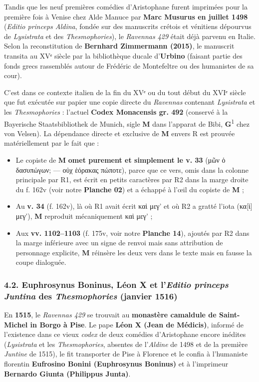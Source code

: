 \documentclass[11pt, a4paper, twoside]{article}
\renewcommand{\_}{\origunderscore\penalty0\relax}
\renewcommand{\texttt}[1]{#1}
\newcommand{\R}{\textbf{R}}
\newcommand{\Run}{\textbf{R}\textsuperscript{1}}
\newcommand{\Rdeux}{\textbf{R}\textsuperscript{2}}
\newcommand{\Gun}{\textbf{G}\textsuperscript{1}}
\newcommand{\M}{\textbf{M}}
\newcommand{\Bibi}{\textit{Bibi}}
\def\R{R}%
\def\Run{R1}%
\def\Rdeux{R2}%
\def\Bibi{Bibi}%
\begin{document}
Tandis que les neuf premières comédies d'Aristophane furent imprimées pour la première fois à Venise chez Alde Manuce par \textbf{Marc Musurus en juillet 1498} (\textit{Editio princeps Aldina}, fondée sur des manuscrits crétois et vénitiens dépourvus de \textit{Lysistrata} et des \textit{Thesmophories}), le \textit{Ravennas 429} était déjà parvenu en Italie. Selon la reconstitution de \textbf{Bernhard Zimmermann (2015)}, le manuscrit transita au XVᵉ siècle par la bibliothèque ducale d'\textbf{Urbino} (faisant partie des fonds grecs rassemblés autour de Frédéric de Montefeltre ou des humanistes de sa cour).

C'est dans ce contexte italien de la fin du XVᵉ ou du tout début du XVIᵉ siècle que fut exécutée sur papier une copie directe du \textit{Ravennas} contenant \textit{Lysistrata} et les \textit{Thesmophories} : l'actuel \textbf{Codex Monacensis gr. 492} (conservé à la Bayerische Staatsbibliothek de Munich, sigle \M{} dans l'apparat de \Bibi{}, \Gun{} chez von Velsen). La dépendance directe et exclusive de \M{} envers \R{} est prouvée matériellement par le fait que :
\begin{itemize}[leftmargin=1.5em, itemsep=2pt]
  \item Le copiste de \M{} \textbf{omet purement et simplement le v. 33} (\texttt{μῶν ὁ δασυπώγων; — οὐχ ἑόρακας πώποτε}), parce que ce vers, omis dans la colonne principale par \Run{}, est écrit en petits caractères par \Rdeux{} dans la marge droite du \texttt{f. 162v} (voir notre \textbf{Planche 02}) et a échappé à l'œil du copiste de \M{} ;
  \item Au \textbf{v. 34} (\texttt{f. 162v}), là où \Run{} avait écrit \texttt{καὶ μεγ'} et où \Rdeux{} a gratté l'iota (\texttt{κα[ὶ] μεγ'}), \M{} reproduit mécaniquement \texttt{καὶ μεγ'} ;
  \item Aux \textbf{vv. 1102–1103} (\texttt{f. 175v}, voir notre \textbf{Planche 14}), ajoutés par \Rdeux{} dans la marge inférieure avec un signe de renvoi mais sans attribution de personnage explicite, \M{} réinsère les deux vers dans le texte mais en fausse la coupe dialoguée.
\end{itemize}


\subsubsection{4.2. Euphrosynus Boninus, Léon X et l'\textit{Editio princeps Juntina} des \textit{Thesmophories} (janvier 1516)}

En \textbf{1515}, le \textit{Ravennas 429} se trouvait au \textbf{monastère camaldule de Saint-Michel in Borgo à Pise}. Le pape \textbf{Léon X (Jean de Médicis)}, informé de l'existence dans ce vieux \textit{codex} de deux comédies d'Aristophane encore inédites (\textit{Lysistrata} et les \textit{Thesmophories}, absentes de l'\textit{Aldine} de 1498 et de la première \textit{Juntine} de 1515), le fit transporter de Pise à Florence et le confia à l'humaniste florentin \textbf{Eufrosino Bonini (Euphrosynus Boninus)} et à l'imprimeur \textbf{Bernardo Giunta (Philippus Junta)}.
\end{document}
